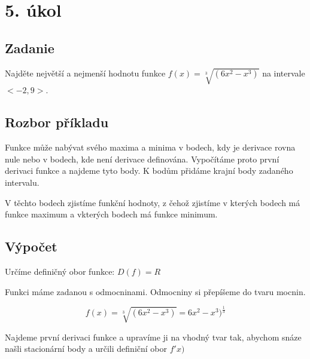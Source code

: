 \section{5. úkol}
\subsection{Zadanie}
 Najděte největší a nejmenší hodnotu funkce $f(x)=\sqrt[3]{(6x^2-x^3)} $ na intervale $ <-2,9>$.

\subsection{Rozbor příkladu}
Funkce může nabývat svého maxima a minima v bodech, kdy je derivace rovna nule nebo v bodech, kde není derivace definována. Vypočítáme proto první derivaci funkce a najdeme tyto body. K bodům přidáme krajní body zadaného intervalu.

V těchto bodech zjistíme funkční hodnoty, z čehož zjistíme v kterých bodech má funkce maximum a vkterých bodech má funkce minimum.
\subsection{Výpočet}
Určíme definičný obor funkce: $D(f)=R$

Funkci máme zadanou s odmocninami. Odmocniny si přepíšeme do tvaru mocnin.

\begin{displaymath}
f(x)=\sqrt[3]{(6x^2-x^3)}=6x^2-x^3)^\frac{1}{3}
\end{displaymath}

Najdeme první derivaci funkce a upravíme ji na vhodný tvar tak, abychom snáze našli stacionární body a určili definiční obor $f'x)$

